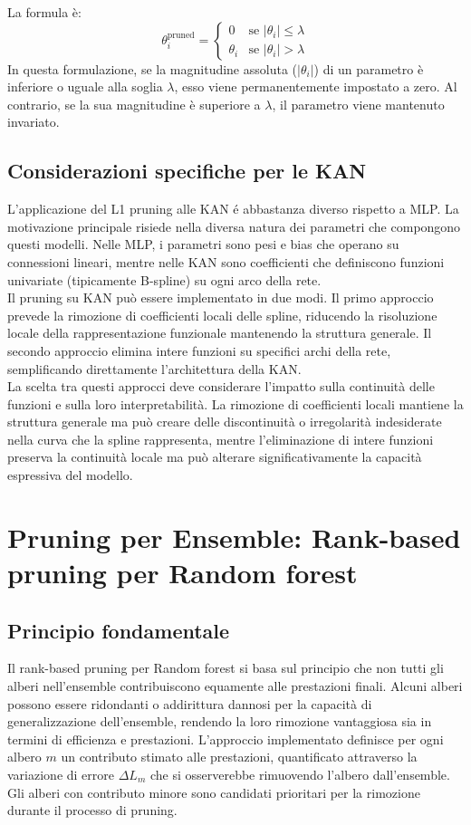 \documentclass[a4paper,12pt]{report}
\begin{document}
	La formula è:
	$$
	\theta_i^{\text{pruned}} = \begin{cases}
		0 & \text{se } |\theta_i| \le \lambda \\
		\theta_i & \text{se } |\theta_i| > \lambda
	\end{cases}
	$$
	In questa formulazione, se la magnitudine assoluta ($|\theta_i|$) di un parametro è inferiore o uguale alla soglia $\lambda$, esso viene permanentemente impostato a zero. Al contrario, se la sua magnitudine è superiore a $\lambda$, il parametro viene mantenuto invariato.
	
	\subsection{Considerazioni specifiche per le KAN}
	L'applicazione del L1 pruning alle KAN é abbastanza diverso rispetto a MLP. La motivazione principale risiede nella diversa natura dei parametri che compongono questi modelli. Nelle MLP, i parametri sono pesi e bias che operano su connessioni lineari, mentre nelle KAN sono coefficienti che definiscono funzioni univariate (tipicamente B-spline) su ogni arco della rete. \\
	Il pruning su KAN può essere implementato in due modi. Il primo approccio prevede la rimozione di coefficienti locali delle spline, riducendo la risoluzione locale della rappresentazione funzionale mantenendo la struttura generale. Il secondo approccio elimina intere funzioni su specifici archi della rete, semplificando direttamente l'architettura della KAN. \\
	La scelta tra questi approcci deve considerare l'impatto sulla continuità delle funzioni e sulla loro interpretabilità. La rimozione di coefficienti locali mantiene la struttura generale ma può creare delle discontinuità o irregolarità indesiderate nella curva che la spline rappresenta, mentre l'eliminazione di intere funzioni preserva la continuità locale ma può alterare significativamente la capacità espressiva del modello.
	
	\section{Pruning per Ensemble: Rank-based pruning per Random forest}
	
	\subsection{Principio fondamentale}
	Il rank-based pruning per Random forest si basa sul principio che non tutti gli alberi nell'ensemble contribuiscono equamente alle prestazioni finali. Alcuni alberi possono essere ridondanti o addirittura dannosi per la capacità di generalizzazione dell'ensemble, rendendo la loro rimozione vantaggiosa sia in termini di efficienza e prestazioni. L'approccio implementato definisce per ogni albero $m$ un contributo stimato alle prestazioni, quantificato attraverso la variazione di errore $\Delta L_m$ che si osserverebbe rimuovendo l'albero dall'ensemble. Gli alberi con contributo minore sono candidati prioritari per la rimozione durante il processo di pruning.
	
\end{document}
